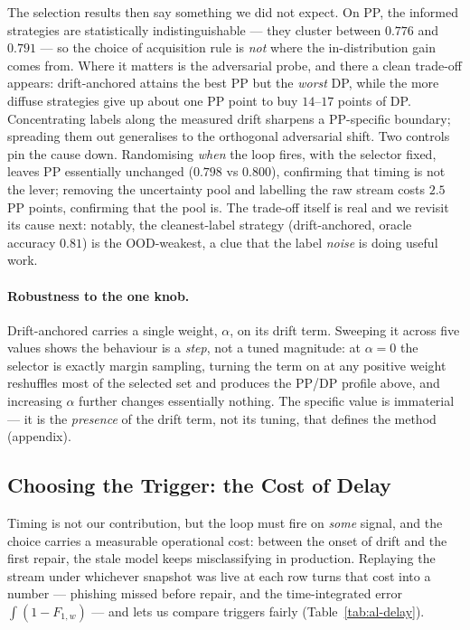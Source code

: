 The selection results then say something we did not expect. On PP, the informed
strategies are statistically indistinguishable --- they cluster between $0.776$
and $0.791$ --- so the choice of acquisition rule is \emph{not} where the
in-distribution gain comes from. Where it matters is the adversarial probe, and
there a clean trade-off appears: drift-anchored attains the best PP but the
\emph{worst} DP, while the more diffuse strategies give up about one PP point to
buy $14$--$17$ points of DP. Concentrating labels along the measured drift
sharpens a PP-specific boundary; spreading them out generalises to the
orthogonal adversarial shift. Two controls pin the cause down. Randomising
\emph{when} the loop fires, with the selector fixed, leaves PP essentially
unchanged ($0.798$ vs $0.800$), confirming that timing is not the lever; removing
the uncertainty pool and labelling the raw stream costs $2.5$ PP points,
confirming that the pool is. The trade-off itself is real and we revisit its
cause next: notably, the cleanest-label strategy (drift-anchored, oracle accuracy
$0.81$) is the OOD-weakest, a clue that the label \emph{noise} is doing useful
work.

\paragraph{Robustness to the one knob.}
\label{ssec:eval-alpha}
Drift-anchored carries a single weight, $\alpha$, on its drift term. Sweeping it
across five values shows the behaviour is a \emph{step}, not a tuned magnitude:
at $\alpha=0$ the selector is exactly margin sampling, turning the term on at any
positive weight reshuffles most of the selected set and produces the PP/DP
profile above, and increasing $\alpha$ further changes essentially nothing. The
specific value is immaterial --- it is the \emph{presence} of the drift term, not
its tuning, that defines the method (appendix).

\subsection{Choosing the Trigger: the Cost of Delay}
\label{ssec:eval-delay}

Timing is not our contribution, but the loop must fire on \emph{some} signal, and
the choice carries a measurable operational cost: between the onset of drift and
the first repair, the stale model keeps misclassifying in production. Replaying
the stream under whichever snapshot was live at each row turns that cost into a
number --- phishing missed before repair, and the time-integrated error
$\int(1{-}F_{1,w})$ --- and lets us compare triggers fairly
(Table~\ref{tab:al-delay}).

